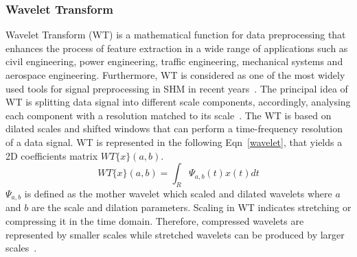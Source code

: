 \subsubsection{Wavelet Transform} 
Wavelet Transform (WT) is a mathematical function for data preprocessing that enhances the process of feature extraction in a wide range of applications such as civil engineering, power engineering, traffic engineering, mechanical systems and aerospace engineering.
Furthermore, WT is considered as one of the most widely used tools for signal preproces\-sing in SHM in recent years~\cite{Taha2006}.
The principal idea of WT is splitting data signal into different scale components, accordingly, analysing each component with a resolution matched to its scale~\cite{Graps1995}.
The WT is based on dilated scales and shifted windows that can perform a time-frequency resolution of a data signal. 
WT is represented in the following Eqn~\ref{wavelet}, that yields a 2D coefficients matrix  $WT\{x\}(a,b)$. 
\begin{equation}
	WT\{x\}(a,b) = \int_{R}^{}\Psi_{a,b}(t)x(t)dt
	\label{wavelet}
\end{equation}
$\Psi_{a,b}$ is defined as the mother wavelet which scaled and dilated wavelets  where $a$ and $b$ are the scale and dilation parameters.
Scaling in WT indicates stretching or compressing it in the time domain. 
Therefore, compressed wavelets are represented by smaller scales while stretched wavelets can be produced by larger scales~\cite{Graps1995}.
%
